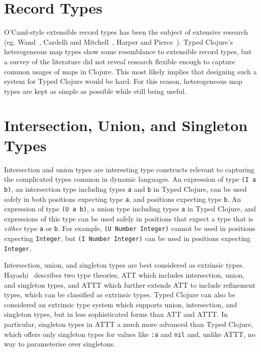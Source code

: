 \section{Record Types}
\label{sec:recordtypes}

O'Caml-style extensible record types has been the subject of extensive research 
(eg. Wand~\cite{Wan89}, Cardelli and Mitchell~\cite{CM91}, Harper and Pierce~\cite{HP91}).
Typed Clojure's heterogeneous map types show some resemblance to extensible
record types, but a survey of the literature did not reveal research flexible
enough to capture common usages of maps in Clojure.
This most likely implies that designing such a system for Typed Clojure would be hard.
For this reason, heterogeneous map types are kept as simple as possible while still being useful.

\section{Intersection, Union, and Singleton Types}
\label{sec:intersectionunion}

Intersection and union types are interesting type constructs relevant to capturing the complicated
types common in dynamic languages.
An expression of type \lstinline|(I a b)|, an intersection type including types \lstinline|a|
and \lstinline|b| in Typed Clojure, can be used safely in both positions expecting type \lstinline|a|,
and positions expecting type \lstinline|b|.
An expression of type \lstinline|(U a b)|, a union type including types \lstinline|a| in Typed Clojure,
and expressions of this type can be used safely in positions 
that expect a type that is \emph{either} type \lstinline|a|
or \lstinline|b|.
For example, \lstinline|(U Number Integer)| cannot be used in positions expecting \lstinline|Integer|,
but \lstinline|(I Number Integer)| can be used in positions expecting \lstinline|Integer|.

Intersection, union, and singleton types are best considered as extrinsic types.
Hayashi~\cite{Hay91} describes two type theories, ATT which includes
intersection, union, and singleton types, and ATTT which further extends ATT
to include refinement types, which can be classified as extrinsic types.
Typed Clojure can also be considered an extrinsic type system which supports
union, intersection, and singleton types, but in less sophisticated forms
than ATT and ATTT.
In particular, singleton types in ATTT a much more advanced than Typed Clojure,
which offers only singleton types for values like \lstinline|:a| and \lstinline|nil|
and, unlike ATTT, no way to parameterise over singletons.

